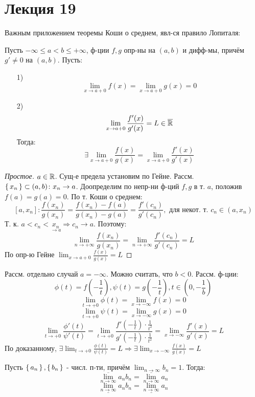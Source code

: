 \section{Лекция 19}
Важным приложением теоремы Коши о среднем, явл-ся правило Лопиталя:
\begin{theorem}
Пусть $-\infty \leq a < b \leq +\infty$, ф-ции $f, g$ опр-ны на $(a, b)$ и дифф-мы, причём $g' \neq 0$ на $(a, b)$. Пусть:
\begin{itemize}
  \item [1) ] \[
  \lim_{x\to a + 0} f(x) = \lim_{x\to a + 0} g(x) = 0
  \]
\item[2) ] \[
\lim_{x\to a + 0} \frac{f'(x)}{g'(x)} = L \in \overline{\mathbb{R}}
\]
Тогда:
\[
\exists \lim_{x\to a + 0} \frac{f(x)}{g(x)} = \lim_{x\to a + 0} \frac{f'(x)}{g'(x)}
\]
\end{itemize}
\end{theorem}
\begin{proof}[Простое]
$a \in \mathbb{R}$. Сущ-е предела установим по Гейне. Рассм. $\set{x_n} \subset (a, b) \colon x_n \rightarrow a$. Доопределим по непр-ни ф-ций $f, g$ в т. $a$, положив $f(a) = g(a) = 0$. По т. Коши о среднем: 
\[
[a, x_n] \colon \frac{f(x_n)}{g(x_n)} = \frac{f(x_n) - f(a)}{g(x_n) - g(a)} = \frac{f'(c_n)}{g'(c_n)}, \text{ для некот. т. $c_n \in (a, x_n)$}
\]
Т. к. $a < c_n < \underset{\rightarrow a}{x_n} \Rightarrow c_n \rightarrow a$. Поэтому:
\[
\lim_{n\to +\infty} \frac{f(x_n)}{g(x_n)} = \lim_{n\to +\infty} \frac{f'(c_n)}{g'(c_n)} = L
\]
По опр-ю Гейне $\lim_{x\to a + 0} \frac{f(x)}{g(x)} = L$
\end{proof}
\begin{note}
Рассм. отдельно случай $a = -\infty$. Можно считать, что $b < 0$. Рассм. ф-ции:
\[
\phi(t) = f\left(-\frac{1}{t}\right), \psi(t) = g\left(-\frac{1}{t}\right), t \in (0, -\frac{1}{b})
\]
\[
\lim_{t\to +0} \phi(t) = \lim_{x\to -\infty} f(x) = 0
\]
\[
\lim_{t\to +0} \psi(t) = \lim_{x\to -\infty} g(x) = 0
\]
\[
\lim_{t\to +0} \frac{\phi'(t)}{\psi'(t)} = \lim_{t\to +0} \dfrac{f'\left(-\frac{1}{t}\right) \cdot \frac{1}{t^{2}}}{g'\left(-\frac{1}{t}\right) \cdot \frac{1}{t^{2}}} = \lim_{x\to -\infty} \frac{f'(x)}{g'(x)} = L
\]
По доказанному, $\exists \lim_{t\to +0} \frac{\phi(t)}{\psi(t)} = L \Rightarrow \exists \lim_{x\to -\infty} \frac{f(x)}{g(x)} = L$
\end{note}
\begin{lemma}
Пусть $\set{a_n}, \set{b_n}$ - числ. п-ти, причём $\lim_{n\to\infty} b_n = 1$. Тогда:
\[
\overline{\lim_{n\to \infty}} a_n b_n = \overline{\lim_{n\to \infty}} a_n
\]
\[
\underline{\lim_{n\to \infty}} a_n b_n = \underline{\lim_{n\to \infty}} a_n
\]
\end{lemma}
